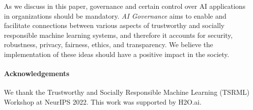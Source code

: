 \documentclass{article}
\begin{document}
As we discuss in this paper, governance and certain control over AI applications in organizations should be mandatory. \emph{AI Governance} aims to enable and facilitate connections between various aspects of trustworthy and socially responsible machine learning systems, and therefore it accounts for security, robustness, privacy, fairness, ethics, and transparency. We believe the implementation of these ideas should have a positive impact in the society. 

\paragraph{Acknowledgements}
We thank the Trustworthy and Socially Responsible Machine Learning (TSRML) Workshop at NeurIPS 2022. This work was supported by H2O.ai.




{\small


}
\end{document}

